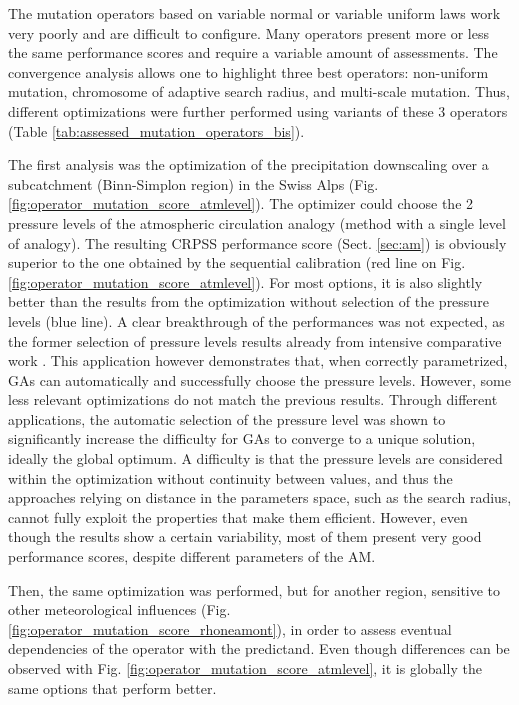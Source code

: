\documentclass{ametsoc}
\begin{document}
The mutation operators based on variable normal or variable uniform laws work very poorly and are difficult to configure. Many operators present more or less the same performance scores and require a variable amount of assessments. The convergence analysis \citep[see][]{Horton2012a} allows one to highlight three best operators: non-uniform mutation, chromosome of adaptive search radius, and multi-scale mutation. Thus, different optimizations were further performed using variants of these 3 operators (Table \ref{tab:assessed_mutation_operators_bis}).

The first analysis was the optimization of the precipitation downscaling over a subcatchment (Binn-Simplon region) in the Swiss Alps (Fig. \ref{fig:operator_mutation_score_atmlevel}). The optimizer could choose the 2 pressure levels of the atmospheric circulation analogy (method with a single level of analogy). The resulting CRPSS performance score (Sect. \ref{sec:am}) is obviously superior to the one obtained by the sequential calibration (red line on Fig. \ref{fig:operator_mutation_score_atmlevel}). For most options, it is also slightly better than the results from the optimization without selection of the pressure levels (blue line). A clear breakthrough of the performances was not expected, as the former selection of pressure levels results already from intensive comparative work \citep{Bontron2004}. This application however demonstrates that, when correctly parametrized, GAs can automatically and successfully choose the pressure levels. However, some less relevant optimizations do not match the previous results. Through different applications, the automatic selection of the pressure level was shown to significantly increase the difficulty for GAs to converge to a unique solution, ideally the global optimum. A difficulty is that the pressure levels are considered within the optimization without continuity between values, and thus the approaches relying on distance in the parameters space, such as the search radius, cannot fully exploit the properties that make them efficient. However, even though the results show a certain variability, most of them present very good performance scores, despite different parameters of the AM.

Then, the same optimization was performed, but for another region, sensitive to other meteorological influences (Fig. \ref{fig:operator_mutation_score_rhoneamont}), in order to assess eventual dependencies of the operator with the predictand. Even though differences can be observed with Fig. \ref{fig:operator_mutation_score_atmlevel}, it is globally the same options that perform better.
\end{document}
